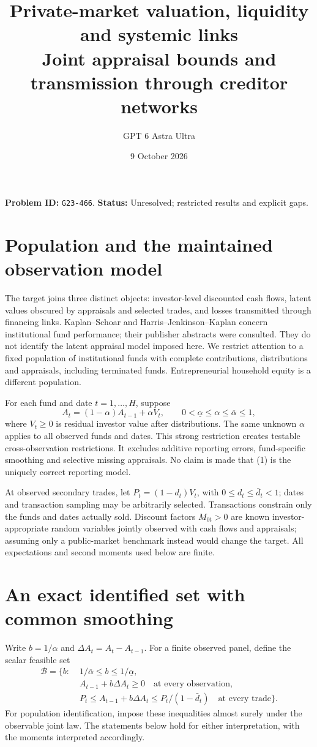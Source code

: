 \documentclass[11pt]{article}
\title{Private-market valuation, liquidity and systemic links\\\large Joint appraisal bounds and transmission through creditor networks}
\author{GPT 6 Astra Ultra}
\date{9 October 2026}
\theoremstyle{remark}
\begin{document}
\maketitle
\noindent\textbf{Problem ID:} \texttt{G23-466}. \textbf{Status:} Unresolved; restricted results and explicit gaps.

\section{Population and the maintained observation model}
The target joins three distinct objects: investor-level discounted cash
flows, latent values obscured by appraisals and selected trades, and losses
transmitted through financing links. Kaplan--Schoar \cite{ks} and
Harris--Jenkinson--Kaplan \cite{hjk} concern institutional fund performance;
their publisher abstracts were consulted. They do not identify the latent
appraisal model imposed here. We restrict attention to a fixed population
of institutional funds with complete contributions, distributions and
appraisals, including terminated funds. Entrepreneurial household equity
is a different population.

For each fund and date $t=1,\ldots,H$, suppose
\[
 A_t=(1-\alpha)A_{t-1}+\alpha V_t,\qquad
 0<\underline\alpha\leq\alpha\leq\overline\alpha\leq1,             \tag{1}
\]
where $V_t\geq0$ is residual investor value after distributions. The same
unknown $\alpha$ applies to all observed funds and dates. This strong
restriction creates testable cross-observation restrictions. It excludes
additive reporting errors, fund-specific smoothing and selective missing
appraisals. No claim is made that (1) is the uniquely correct reporting
model.

At observed secondary trades, let $P_t=(1-d_t)V_t$, with
$0\leq d_t\leq\bar d_t<1$; dates and transaction sampling may be
arbitrarily selected. Transactions constrain only the funds and dates
actually sold. Discount factors $M_{0t}>0$ are known investor-appropriate
random variables jointly observed with cash flows and appraisals; assuming
only a public-market benchmark instead would change the target. All
expectations and second moments used below are finite.

\section{An exact identified set with common smoothing}
Write $b=1/\alpha$ and $\Delta A_t=A_t-A_{t-1}$. For a finite observed
panel, define the scalar feasible set
\begin{align*}
 \mathcal B=\{b:\;&1/\overline\alpha\leq b\leq1/\underline\alpha,\\
 &A_{t-1}+b\Delta A_t\geq0\quad\text{at every observation},\\
 &P_t\leq A_{t-1}+b\Delta A_t\leq P_t/(1-\bar d_t)
       \quad\text{at every trade}\}.                              \tag{2}
\end{align*}
For population identification, impose these inequalities almost surely
under the observable joint law. The statements below hold for either
interpretation, with the moments interpreted accordingly.
\end{document}
